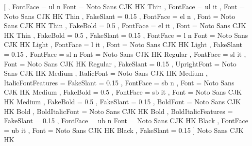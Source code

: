   [
    , FontFace = {ul} {n}  { Font = Noto Sans CJK HK Thin }
    , FontFace = {ul} {it} {
                             , Font      = Noto Sans CJK HK Thin
                             , FakeSlant = 0.15
                           }
    , FontFace = {el} {n}  {
                             , Font      = Noto Sans CJK HK Thin
                             , FakeBold  = 0.5
                           }
    , FontFace = {el} {it} {
                             , Font      = Noto Sans CJK HK Thin
                             , FakeBold  = 0.5
                             , FakeSlant = 0.15
                           }
    , FontFace = {l}  {n}  { Font = Noto Sans CJK HK Light }
    , FontFace = {l}  {it} {
                             , Font      = Noto Sans CJK HK Light
                             , FakeSlant = 0.15
                           }
    , FontFace = {sl} {n}  { Font = Noto Sans CJK HK Regular }
    , FontFace = {sl} {it} {
                             , Font      = Noto Sans CJK HK Regular
                             , FakeSlant = 0.15
                           }
    , UprightFont        = Noto Sans CJK HK Medium
    , ItalicFont         = Noto Sans CJK HK Medium
    , ItalicFontFeatures = { FakeSlant = 0.15 }
    , FontFace = {sb} {n}  {
                             , Font      = Noto Sans CJK HK Medium
                             , FakeBold  = 0.5
                           }
    , FontFace = {sb} {it} {
                             , Font      = Noto Sans CJK HK Medium
                             , FakeBold  = 0.5
                             , FakeSlant = 0.15
                           }
    , BoldFont           = Noto Sans CJK HK Bold
    , BoldItalicFont     = Noto Sans CJK HK Bold
    , BoldItalicFeatures = { FakeSlant = 0.15 }
    , FontFace = {ub} {n} { Font = Noto Sans CJK HK Black }
    , FontFace = {ub} {it} {
                             , Font      = Noto Sans CJK HK Black
                             , FakeSlant = 0.15
                           }
  ]
  {Noto Sans CJK HK}


